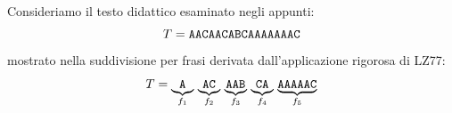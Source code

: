 Consideriamo il testo didattico esaminato negli appunti:
\begin{equation}
  T = \text{\texttt{AACAACABCAAAAAAAC}}
\end{equation}
mostrato nella suddivisione per frasi derivata dall'applicazione rigorosa di LZ77:
\begin{equation}
  T = \underbrace{\text{\texttt{A}}}_{f_1} \, \underbrace{\text{\texttt{AC}}}_{f_2} \, \underbrace{\text{\texttt{AAB}}}_{f_3} \, \underbrace{\text{\texttt{CA}}}_{f_4} \, \underbrace{\text{\texttt{AAAAAC}}}_{f_5}
\end{equation}

\begin{table}[H]
\centering
\small
\caption{Tracciamento dettagliato del parsing LZ77 su $T = \text{\texttt{AACAACABCAAAAAAAC}}$}
\label{tab:lz77-trace-completo}
\end{table}

